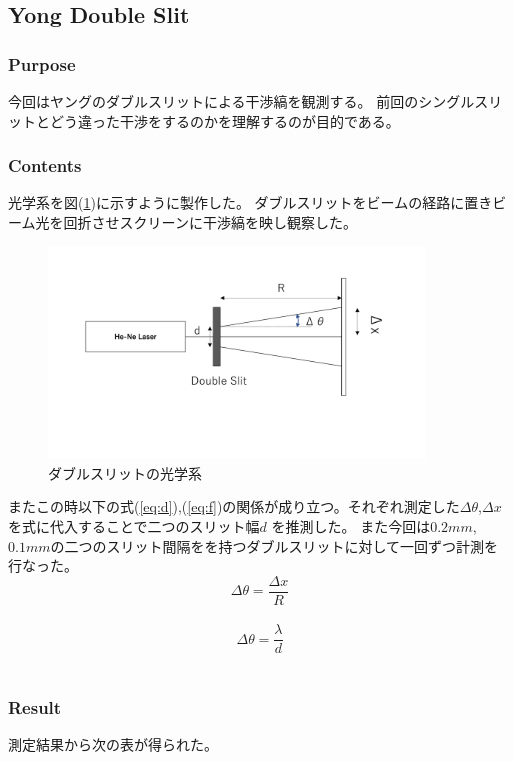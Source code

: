\documentclass[11pt, a4paper]{jsarticle}
\begin{document}
\subsection{Yong Double Slit}
\subsubsection{Purpose}
今回はヤングのダブルスリットによる干渉縞を観測する。
前回のシングルスリットとどう違った干渉をするのかを理解するのが目的である。
\subsubsection{Contents}
光学系を図(\ref{fig:eleven})に示すように製作した。
ダブルスリットをビームの経路に置きビーム光を回折させスクリーンに干渉縞を映し観察した。

\begin{figure}[htbp]
 \begin{center}
  \includegraphics[width=100mm]{fig11.png}
 \end{center}
 \caption{ダブルスリットの光学系}
 \label{fig:eleven}
\end{figure}

またこの時以下の式(\ref{eq:d}),(\ref{eq:f})の関係が成り立つ。それぞれ測定した$\Delta \theta$,$\Delta x$を式に代入することで二つのスリット幅$d$
を推測した。
また今回は$0.2mm$,$0.1mm$の二つのスリット間隔をを持つダブルスリットに対して一回ずつ計測を行なった。\\
\begin{equation}
    \Delta\theta = \frac{\Delta x}{R} \label{eq:d}
\end{equation}\\
\begin{equation}
    \Delta\theta = \frac{\lambda}{d} \label{eq:f}
\end{equation}\\

\subsubsection{Result}
測定結果から次の表が得られた。
\end{document}

